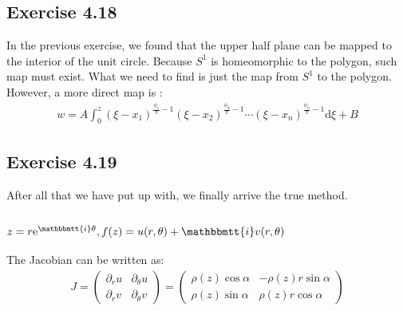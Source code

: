 \documentclass[]{ctexart}
\newcommand{\mi}{\mathbbmtt{i}}
\newcommand{\di}{\mathrm{d}}
\newcommand{\pa}{\partial}
\newcommand{\me}{\mathrm{e}}
\begin{document}
%			
%			
		
	\subsection{Exercise 4.18}
		In the previous exercise, we found that the upper half plane can be mapped to the interior of the unit circle. Because $S^1$ is homeomorphic to the polygon, such map must exist. What we need to find is just the map from $S^1$ to the polygon. However, a more direct map is :
			\begin{equation*}
			\begin{aligned}
				w=A\int_{0}^{z}(\xi -x_1)^{\frac{\phi_1}{\pi}-1}(\xi -x_2)^{\frac{\phi_2}{\pi}-1}\cdots(\xi -x_n)^{\frac{\phi_n}{\pi}-1}\di \xi +B
			\end{aligned}
			\end{equation*}
			
	\subsection{Exercise 4.19}
		After all that we have put up with, we finally arrive the true method.
			\subsubsection{$z=r\me ^{\mi \theta},f(z)=u(r,\theta)+\mi v(r,\theta)$}
				The Jacobian can be written as:
					\begin{equation*}
					\begin{aligned}
						J=
						\begin{pmatrix}
							\pa_ru & \pa_{\theta}u\\
							\pa_rv & \pa_{\theta}v
						\end{pmatrix}
						=
						\begin{pmatrix}
							\rho(z) \cos \alpha & -\rho(z) r\sin \alpha\\
							\rho(z) \sin \alpha & \rho(z) r\cos \alpha
						\end{pmatrix}
					\end{aligned}
					\end{equation*}
				
\end{document}
